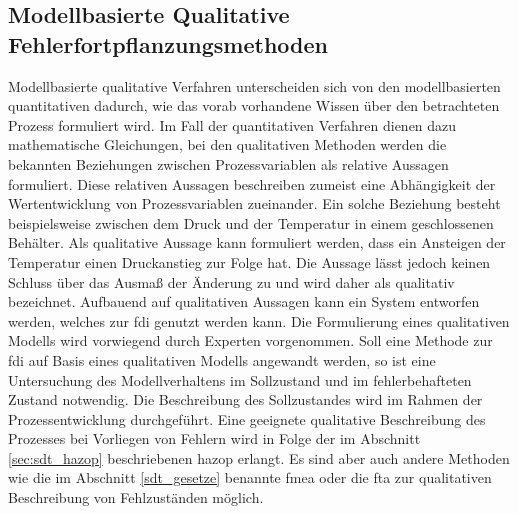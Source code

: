 \subsection{Modellbasierte Qualitative Fehlerfortpflanzungsmethoden}\label{sec:fAna_modQual}
Modellbasierte qualitative Verfahren unterscheiden sich von den modellbasierten quantitativen dadurch, wie das vorab vorhandene Wissen \"uber den betrachteten Prozess formuliert wird. Im Fall der quantitativen Verfahren dienen dazu mathematische Gleichungen, bei den qualitativen Methoden werden die bekannten Beziehungen zwischen Prozessvariablen als relative Aussagen formuliert. Diese relativen Aussagen beschreiben zumeist eine Abh\"angigkeit der Wertentwicklung von Prozessvariablen zueinander. Ein solche Beziehung besteht beispielsweise zwischen dem Druck und der Temperatur in einem geschlossenen Beh\"alter. Als qualitative Aussage kann formuliert werden, dass ein Ansteigen der Temperatur einen Druckanstieg zur Folge hat. Die Aussage l\"asst jedoch keinen Schluss \"uber das Ausma\ss{} der \"Anderung zu und wird daher als qualitativ bezeichnet. \newline
Aufbauend auf qualitativen Aussagen kann ein System entworfen werden, welches zur \ac{fdi} genutzt werden kann. \newline
Die Formulierung eines qualitativen Modells wird vorwiegend durch Experten vorgenommen. Soll eine Methode zur \ac{fdi} auf Basis eines qualitativen Modells angewandt werden, so ist eine Untersuchung des Modellverhaltens im Sollzustand und im fehlerbehafteten Zustand notwendig. Die Beschreibung des Sollzustandes wird im Rahmen der Prozessentwicklung durchgef\"uhrt. Eine geeignete qualitative Beschreibung des Prozesses bei Vorliegen von Fehlern wird in Folge der im Abschnitt \ref{sec:sdt_hazop} beschriebenen \ac{hazop} erlangt. Es sind aber auch andere Methoden wie die im Abschnitt \ref{sdt_gesetze} benannte \ac{fmea} oder die \ac{fta} zur qualitativen Beschreibung von Fehlzust\"anden m\"oglich.


